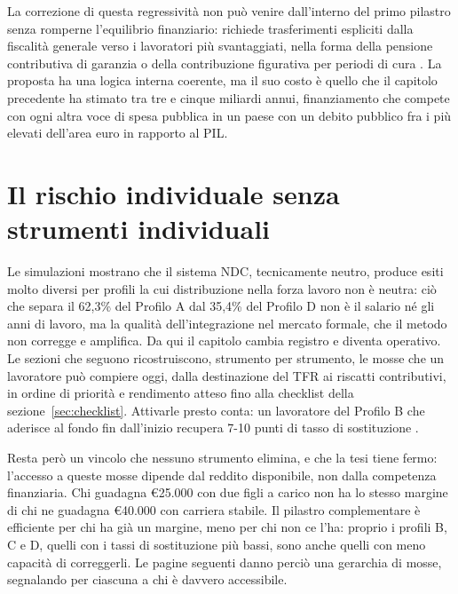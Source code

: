 \medskip
\noindent
La correzione di questa regressività non può venire dall'interno del primo
pilastro senza romperne l'equilibrio finanziario: richiede trasferimenti
espliciti dalla fiscalità generale verso i lavoratori più svantaggiati, nella
forma della pensione contributiva di garanzia o della contribuzione figurativa
per periodi di cura \cite{Raitano2020}. La proposta ha una logica interna
coerente, ma il suo costo è quello che il capitolo precedente ha stimato
tra tre e cinque miliardi annui, finanziamento che compete con ogni altra
voce di spesa pubblica in un paese con un debito pubblico fra i più elevati dell'area euro in
rapporto al PIL.

\section{Il rischio individuale senza strumenti individuali}
\label{sec:rischio_individuale}

\noindent
Le simulazioni mostrano che il sistema NDC, tecnicamente neutro, produce esiti
molto diversi per profili la cui distribuzione nella forza lavoro non è neutra: ciò
che separa il 62,3\% del Profilo A dal 35,4\% del Profilo D non è il salario né gli
anni di lavoro, ma la qualità dell'integrazione nel mercato formale, che il metodo
non corregge e amplifica. Da qui il capitolo cambia registro e diventa operativo.
Le sezioni che seguono ricostruiscono, strumento per strumento, le mosse che un
lavoratore può compiere oggi, dalla destinazione del TFR ai riscatti contributivi,
in ordine di priorità e rendimento atteso fino alla checklist della
sezione~\ref{sec:checklist}. Attivarle presto conta: un lavoratore del Profilo B che
aderisce al fondo fin dall'inizio recupera 7-10 punti di tasso di sostituzione
\cite{MEF_RGS2025}.

\medskip
\noindent
Resta però un vincolo che nessuno strumento elimina, e che la tesi tiene fermo:
l'accesso a queste mosse dipende dal reddito disponibile, non dalla competenza
finanziaria. Chi guadagna €25.000 con due figli a carico non ha lo stesso margine
di chi ne guadagna €40.000 con carriera stabile. Il pilastro complementare è
efficiente per chi ha già un margine, meno per chi non ce l'ha: proprio i profili
B, C e D, quelli con i tassi di sostituzione più bassi, sono anche quelli con meno
capacità di correggerli. Le pagine seguenti danno perciò una gerarchia di mosse,
segnalando per ciascuna a chi è davvero accessibile.

